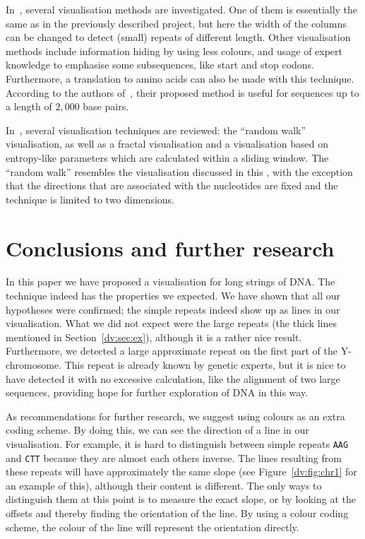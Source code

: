 \documentclass[oribibl]{lncs/llncs}
\begin{document}
In~\cite{IVD}, several visualisation methods are investigated. One of them is
essentially the same as in the previously described project, but here the width
of the columns can be changed to detect (small) repeats of different length.
Other visualisation methods include information hiding by using less colours,
and usage of expert knowledge to emphasise some subsequences, like start and
stop codons. Furthermore, a translation to amino acids can also be made with
this technique. According to the authors of~\cite{IVD}, their proposed method
is useful for sequences up to a length of $2,\!000$ base pairs.

In~\cite{MS}, several visualisation techniques are reviewed: the ``random
walk'' visualisation, as well as a fractal visualisation and a visualisation
based on entropy-like parameters which are calculated within a sliding window.
The ``random walk'' resembles the visualisation discussed in this \this, with
the exception that the directions that are associated with the nucleotides are 
fixed and the technique is limited to two dimensions.

\section{Conclusions and further research}\label{dv:sec:concl}
In this paper we have proposed a visualisation for long strings of DNA. The
technique indeed has the properties we expected. We have shown that all our
hypotheses were confirmed; the simple repeats indeed show up as lines in our
visualisation. What we did not expect were the large repeats (the thick lines
mentioned in Section~\ref{dv:sec:ex}), although it is a rather nice result.
Furthermore, we detected a large approximate repeat on the first part of the
Y-chromosome. This repeat is already known by genetic experts, but it is nice
to have detected it with no excessive calculation, like the alignment of two
large sequences, providing hope for further exploration of DNA in this way.

As recommendations for further research, we suggest using colours as an extra
coding scheme. By doing this, we can see the direction of a line in our 
visualisation. For example, it is hard to distinguish between simple repeats
\texttt{AAG} and \texttt{CTT} because they are almost each others inverse. The
lines resulting from these repeats will have approximately the same slope
(see Figure~\ref{dv:fig:chr1} for an example of this), although their content
is different. The only ways to distinguish them at this point is to measure the
exact slope, or by looking at the offsets and thereby finding the orientation
of the line. By using a colour coding scheme, the colour of the line will
represent the orientation directly.
\end{document}
